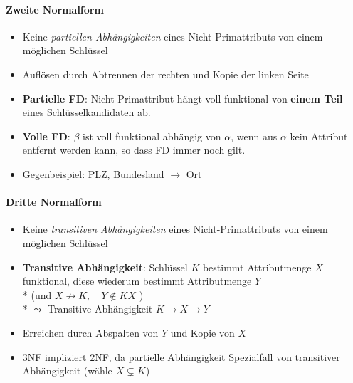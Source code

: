\paragraph{Zweite Normalform}
\begin{itemize}
	\item Keine \emph{partiellen Abhängigkeiten} eines Nicht-Primattributs von einem möglichen Schlüssel
	\item Auflösen durch Abtrennen der rechten und Kopie der linken Seite
	\item \textbf{Partielle FD}: Nicht-Primattribut hängt voll funktional von \textbf{einem Teil} eines Schlüsselkandidaten ab.
	\item \textbf{Volle FD}: \( \beta \) ist voll funktional abhängig von \( \alpha \), wenn aus \( \alpha \) kein Attribut entfernt werden kann, so dass FD immer noch gilt.
	\item Gegenbeispiel: PLZ, Bundesland \( \to \) Ort
\end{itemize}

\paragraph{Dritte Normalform}
\begin{itemize}
	\item Keine \emph{transitiven Abhängigkeiten} eines Nicht-Primattributs von einem möglichen Schlüssel
	\item \textbf{Transitive Abhängigkeit}: Schlüssel \( K \) bestimmt Attributmenge \( X \) funktional, diese wiederum bestimmt Attributmenge \( Y \) \\* 
	(und $X \nrightarrow K, \quad Y \notin KX$ ) \\*
	\( \leadsto \) Transitive Abhängigkeit \(K  \to X \to Y \)
	\item Erreichen durch Abspalten von \( Y \) und Kopie von \( X \)
	\item 3NF impliziert 2NF, da partielle Abhängigkeit Spezialfall von transitiver Abhängigkeit (wähle $X \subsetneq K$)
\end{itemize}

